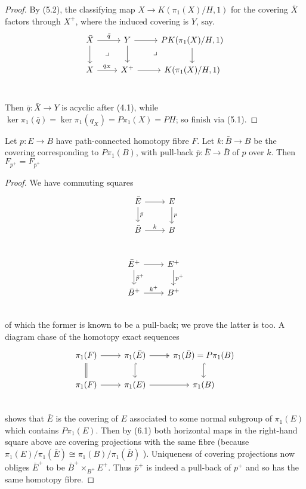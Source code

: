 \begin{proof}
By (5.2), the classifying map $X \longrightarrow K(\pi_1(X)/H, 1)$ for the covering $\bar{X}$ factors through $X^+$, where the induced covering is $Y$, say.
\[
\begin{tikzcd}
 \bar{X} \arrow{r}{\bar{q}} \arrow{d} \arrow[dr, phantom, "\lrcorner"] & Y \arrow{d} \arrow{r} \arrow[dr, phantom, "\lrcorner"]&PK(\pi_1(X)/H,1) \arrow{d} \\
 X \arrow{r}{q_X} & X^+ \arrow[r] & K(\pi_1(X)/H,1)\\
 \end{tikzcd}
 \]

Then $\bar{q} \colon   \bar{X}\longrightarrow Y$ is acyclic after (4.1), while $\ker \pi_1(\bar{q}) = \ker \pi_1(q_X) = P\pi_1(X) =PH$; so finish via (5.1).
\end{proof}

\begin{corollary}
  Let $p \colon   E \longrightarrow B$ have path-connected homotopy fibre $F$. Let $k \colon   \bar{B} \longrightarrow B$ be the covering corresponding to $P\pi_1(B)$, with pull-back $\bar{p} \colon  \bar{E} \longrightarrow \bar{B}$ of $p$ over $k$. Then $F_{p^+}=F_{\bar{p}^+} $
\end{corollary}
\begin{proof}
 We have commuting squares
\[
\begin{tikzcd}
 \bar{E} \arrow{r} \arrow{d}{\bar{p}}  & E \arrow{d}{p} \\
 \bar{B} \arrow{r}{k} & B\\
 \end{tikzcd}
 \]
 \[
\begin{tikzcd}
 \bar{E}^+ \arrow{r} \arrow{d}{\bar{p}^+}  & E^+ \arrow{d}{p^+} \\
 \bar{B}^+ \arrow{r}{k^+} & B^+\\
 \end{tikzcd}
 \]
of which the former is known to be a pull-back; we prove the latter is too. A diagram chase of the homotopy exact sequences
\[
\begin{tikzcd}
 \pi_1(F) \arrow{r} \arrow[equal]{d} & \pi_1(\bar{E})  \arrow[hook]{d} \arrow[two heads]{r} & \pi_1(\bar{B})=P\pi_1(B) \arrow[hook]{d}\\
 \pi_1(F)  \arrow{r} & \pi_1(E) \arrow{r} &\pi_1(B)\\
 \end{tikzcd}
 \]
shows that $\bar{E}$ is the covering of $E$ associated to some normal subgroup of $\pi_1(E)$ which contains $P\pi_1(E)$. Then by (6.1) both horizontal maps in the right-hand square above are covering projections with the same fibre (because $\pi_1(E)/\pi_1(\bar{E}) \cong \pi_1(B)/\pi_1(\bar{B})$ ). Uniqueness of covering projections now obliges $\bar{E}^+$ to be $\bar{B}^+ \times_{B^+} E^+$. Thus $\bar{p}^+$ is indeed a pull-back of $p^+$ and so has the
same homotopy fibre.
 \end{proof}
  
